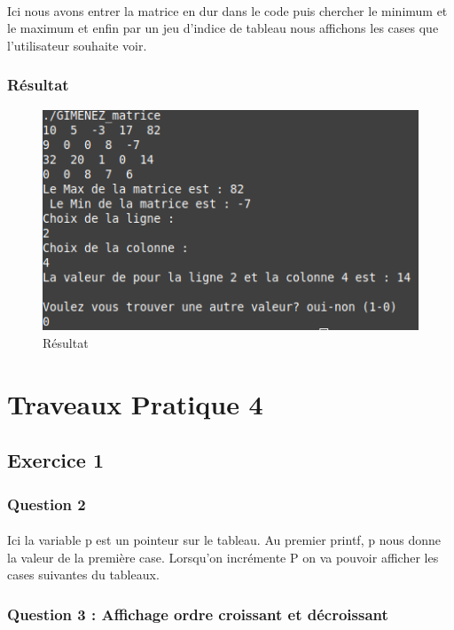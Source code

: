 \documentclass[10pt,a4paper]{article}
\begin{document}
\paragraph{}
Ici nous avons entrer la matrice en dur dans le code puis chercher le minimum et le maximum et enfin par un jeu d'indice de tableau nous 
affichons les cases que l'utilisateur souhaite voir.
\subsubsection{Résultat}
\begin{figure}[h] 
\begin{center}
\includegraphics[scale=.3]{images/matrice_ex}
\end{center}
\caption{Résultat}
\end{figure}


\section{Traveaux Pratique 4}
\subsection{Exercice 1}
\subsubsection{Question 2}
\paragraph{}
Ici la variable p est un pointeur sur le tableau. Au premier printf, p nous donne la valeur de la première case. Lorsqu’on incrémente P on va pouvoir 
afficher les cases suivantes du tableaux.

\pagebreak	
\subsubsection{Question 3 : Affichage ordre croissant et décroissant}
\end{document}

